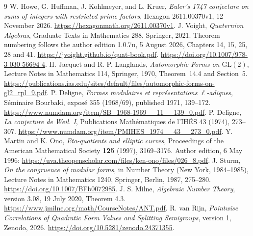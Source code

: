 \begin{thebibliography}{9}\footnotesize
{} W. Howe, G. Huffman, J. Kohlmeyer, and L. Kruer,
\emph{Euler's 1747 conjecture on sums of integers with restricted prime
factors}, Hexagon 2611.00370v1, 12 November 2026.
\url{https://hexagonmath.org/2611.00370v1}.
 J. Voight, \emph{Quaternion Algebras}, Graduate Texts in
Mathematics 288, Springer, 2021. Theorem numbering follows the author edition
1.0.7u, 5 August 2026, Chapters 14, 15, 25, 28 and 41.
\url{https://jvoight.github.io/quat-book.pdf}.
\url{https://doi.org/10.1007/978-3-030-56694-4}.
 H. Jacquet and R. P. Langlands,
\emph{Automorphic Forms on $\mathrm{GL}(2)$}, Lecture Notes in Mathematics
114, Springer, 1970, Theorem~14.4 and Section~5.
\url{https://publications.ias.edu/sites/default/files/automorphic-forms-on-gl2_rpl_9.pdf}.
 P. Deligne,
\emph{Formes modulaires et repr\'esentations $\ell$-adiques},
S\'eminaire Bourbaki, expos\'e 355 (1968/69), published 1971, 139--172.
\url{https://www.numdam.org/item/SB_1968-1969__11__139_0.pdf}.
 P. Deligne, \emph{La conjecture de Weil. I},
Publications Math\'ematiques de l'IH\'ES 43 (1974), 273--307.
\url{https://www.numdam.org/item/PMIHES_1974__43__273_0.pdf}.
 Y. Martin and K. Ono,
\emph{Eta-quotients and elliptic curves}, Proceedings of the American
Mathematical Society \textbf{125} (1997), 3169--3176.
Author edition, 6 May 1996:
\url{https://uva.theopenscholar.com/files/ken-ono/files/026_8.pdf}.
 J. Sturm,
\emph{On the congruence of modular forms}, in Number Theory
(New York, 1984--1985), Lecture Notes in Mathematics 1240,
Springer, Berlin, 1987, 275--280.
\url{https://doi.org/10.1007/BFb0072985}.
 J. S. Milne,
\emph{Algebraic Number Theory}, version 3.08, 19 July 2020,
Theorem 4.3. \url{https://www.jmilne.org/math/CourseNotes/ANT.pdf}.
R. van Rijn,
\emph{Pointwise Correlations of Quadratic Form Values and Splitting Semigroups},
version 1, Zenodo, 2026.
\url{https://doi.org/10.5281/zenodo.24371355}.
\end{thebibliography}
